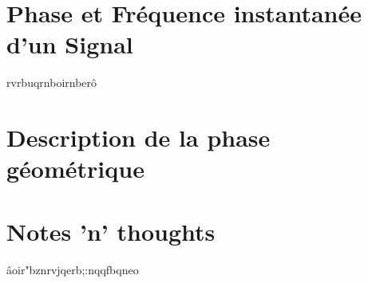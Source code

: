 	
	
	
	
	






\part{Phase et Fréquence instantanée d'un Signal}\label{part:param_instant}
	
	rvrbuqrnboirnberô


\part{Description de la phase géométrique}\label{part:phase_geo}
	
	



\part{Notes 'n' thoughts}

	âoir"bznrvjqerb;:nqqfbqneo
	
	
	
	
	

\newpage

\listoffigures
\vfill
\lstlistoflistings
\vfill

\newpage

{}


